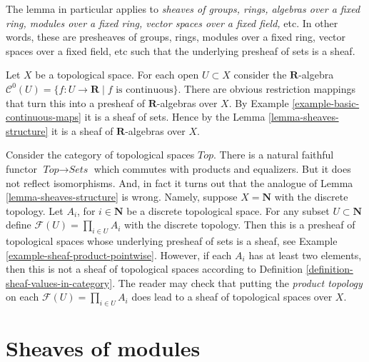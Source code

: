 \noindent
The lemma in particular applies to
{\it sheaves of groups, rings, algebras over a fixed ring, modules
over a fixed ring, vector spaces over a fixed field, } etc.
In other words, these are presheaves of groups, rings,
modules over a fixed ring, vector spaces over a fixed field, etc
such that the underlying presheaf of sets is a sheaf.

\begin{example}
\label{example-C0-sheaf-rings}
Let $X$ be a topological space. For each open $U \subset X$ consider
the $\mathbf{R}$-algebra
$\mathcal{C}^{0}(U) = \{ f : U \to \mathbf{R} \mid f\text{ is continuous}\}$.
There are obvious restriction mappings that turn this into a
presheaf of $\mathbf{R}$-algebras over $X$.
By Example \ref{example-basic-continuous-maps} it is a sheaf of sets.
Hence by the Lemma \ref{lemma-sheaves-structure} it is a sheaf of
$\mathbf{R}$-algebras over $X$.
\end{example}

\begin{example}
\label{example-sheaves-topological-spaces}
Consider the category of topological spaces $\textit{Top}$.
There is a natural faithful functor $\textit{Top} \to \textit{Sets}$
which commutes with products and equalizers. But it does
not reflect isomorphisms. And, in fact it turns out that
the analogue of Lemma \ref{lemma-sheaves-structure} is wrong.
Namely, suppose $X = \mathbf{N}$ with the discrete
topology. Let $A_i$, for $i \in \mathbf{N}$ be a discrete
topological space. For any subset $U \subset \mathbf{N}$
define $\mathcal{F}(U) = \prod_{i\in U} A_i$ with the
discrete topology. Then this is a presheaf of topological
spaces whose underlying presheaf of sets is a sheaf, see
Example \ref{example-sheaf-product-pointwise}.
However, if each $A_i$ has at least two elements, then
this is not a sheaf of topological spaces
according to Definition \ref{definition-sheaf-values-in-category}.
The reader may check that putting the {\it product topology} on
each $\mathcal{F}(U) = \prod_{i\in U} A_i$ does lead to a sheaf
of topological spaces over $X$.
\end{example}


\section{Sheaves of modules}
\label{section-sheaves-modules}

